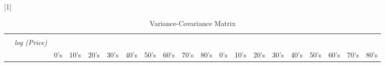 \begin{landscape}
\begin{table}[h]
\caption{Variance-Covariance Matrix}\label{tab:vce_lnfare}\\

{
\def\sym#1{\ifmmode^{#1}\else\(^{#1}\)\fi}
\begin{center}
\scalebox{0.75}[1]{
\begin{tabular}{l*{19}{c}}
\hline\hline
            &\multicolumn{1}{c}{}&
            \multicolumn{1}{c}{}&
            \multicolumn{1}{c}{}&
            \multicolumn{1}{c}{}&
            \multicolumn{1}{c}{}&
            \multicolumn{1}{c}{}&
            \multicolumn{1}{c}{}&
            \multicolumn{1}{c}{}&
            \multicolumn{1}{c}{}&
            \multicolumn{1}{c}{}&
            \multicolumn{1}{c}{}&
            \multicolumn{1}{c}{}&
            \multicolumn{1}{c}{}&
            \multicolumn{1}{c}{}&
            \multicolumn{1}{c}{}&
            \multicolumn{1}{c}{}&
            \multicolumn{1}{c}{}&
            \multicolumn{1}{c}{}&
            \multicolumn{1}{c}{}
            \\
                        &\multicolumn{1}{c}{\textit{log (Price)}}&
            \multicolumn{1}{c}{}&
            \multicolumn{1}{c}{}&
            \multicolumn{1}{c}{}&
            \multicolumn{1}{c}{}&
            \multicolumn{1}{c}{}&
            \multicolumn{1}{c}{}&
            \multicolumn{1}{c}{}&
            \multicolumn{1}{c}{}&
            \multicolumn{1}{c}{}&
            \multicolumn{1}{c}{}&
            \multicolumn{1}{c}{}&
            \multicolumn{1}{c}{}&
            \multicolumn{1}{c}{}&
            \multicolumn{1}{c}{}&
            \multicolumn{1}{c}{}&
            \multicolumn{1}{c}{}&
            \multicolumn{1}{c}{}&
            \multicolumn{1}{c}{}
            \\
                        &\multicolumn{1}{c}{}&
            \multicolumn{1}{c}{0's}&
            \multicolumn{1}{c}{10's}&
            \multicolumn{1}{c}{20's}&
            \multicolumn{1}{c}{30's}&
            \multicolumn{1}{c}{40's}&
            \multicolumn{1}{c}{50's}&
            \multicolumn{1}{c}{60's}&
            \multicolumn{1}{c}{70's}&
            \multicolumn{1}{c}{80's}&
            \multicolumn{1}{c}{0's}&
            \multicolumn{1}{c}{10's}&
            \multicolumn{1}{c}{20's}&
            \multicolumn{1}{c}{30's}&
            \multicolumn{1}{c}{40's}&
            \multicolumn{1}{c}{50's}&
            \multicolumn{1}{c}{60's}&
            \multicolumn{1}{c}{70's}&
            \multicolumn{1}{c}{80's}

\end{tabular}}
\end{center}}
\end{table}
\end{landscape}
